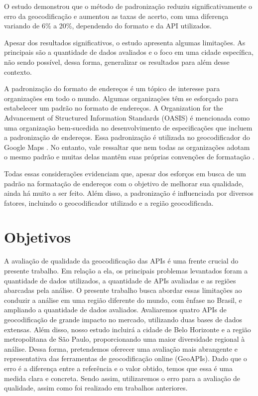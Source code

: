O estudo demonstrou que o método de padronização reduziu significativamente o erro da geocodificação e aumentou as taxas de acerto, com uma diferença variando de 6\% a 20\%, dependendo do formato e da API utilizados.

Apesar dos resultados significativos, o estudo apresenta algumas limitações. As principais são a quantidade de dados avaliados e o foco em uma cidade específica, não sendo possível, dessa forma, generalizar os resultados para além desse contexto.

A padronização do formato de endereços é um tópico de interesse para organizações em todo o mundo. Algumas organizações têm se esforçado para estabelecer um padrão no formato de endereços. A Organization for the Advancement of Structured Information Standards (OASIS) é mencionada como uma organização bem-sucedida no desenvolvimento de especificações que incluem a padronização de endereços. Essa padronização é utilizada no geocodificador do Google Maps \cite{GoogleDoc}. No entanto, vale ressaltar que nem todas as organizações adotam o mesmo padrão e muitas delas mantêm suas próprias convenções de formatação \cite{behr2010}.

Todas essas considerações evidenciam que, apesar dos esforços em busca de um padrão na formatação de endereços com o objetivo de melhorar sua qualidade, ainda há muito a ser feito. Além disso, a padronização é influenciada por diversos fatores, incluindo o geocodificador utilizado e a região geocodificada. 

\section{Objetivos}

A avaliação de qualidade da geocodificação das APIs é uma frente crucial do presente trabalho. Em relação a ela, os principais problemas levantados foram a quantidade de dados utilizados, a quantidade de APIs avaliadas e as regiões abarcadas pela análise. O presente trabalho busca abordar essas limitações ao conduzir a análise em uma região diferente do mundo, com ênfase no Brasil, e ampliando a quantidade de dados avaliados. Avaliaremos quatro APIs de geocodificação de grande impacto no mercado, utilizando duas bases de dados extensas. Além disso, nosso estudo incluirá a cidade de Belo Horizonte e a região metropolitana de São Paulo, proporcionando uma maior diversidade regional à análise. Dessa forma, pretendemos oferecer uma avaliação mais abrangente e representativa das ferramentas de geocodificação online (GeoAPIs). Dado que o erro é a diferença entre a referência e o valor obtido, temos que essa é uma medida clara e concreta. Sendo assim, utilizaremos o erro para a avaliação de qualidade, assim como foi realizado em trabalhos anteriores.

